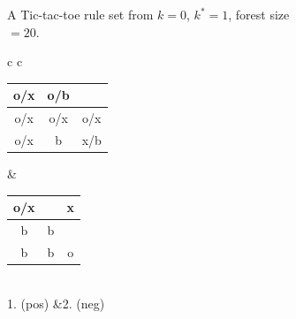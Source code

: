 \documentclass[10pt]{article}
\begin{document}
\begin{figure}[!ht]
\begin{subfigure}{\textwidth}
\begin{tabular}{c c}
\end{tabular}
\caption{A Tic-tac-toe rule set from $k=0$, $k^*=1$, forest size $=20$.}
\label{fig:ttt0-1-20}\end{subfigure}
\vspace{1em}

\begin{subfigure}{\textwidth}
\centering
\begin{tabular}{c c}
	\begin{small}
	\begin{tabular}{c|c|c}
	\hspace*{-0.4em}o/x\hspace*{-0.4em}&\hspace*{-0.4em}o/b\hspace*{-0.4em}&  \\ \hline
	\hspace*{-0.4em}o/x\hspace*{-0.4em}&\hspace*{-0.4em}o/x\hspace*{-0.4em}&\hspace*{-0.4em}o/x\hspace*{-0.4em}\\ \hline
	\hspace*{-0.4em}o/x\hspace*{-0.4em}&\hspace*{-0.4em}b\hspace*{-0.4em}&\hspace*{-0.4em}x/b\hspace*{-0.4em}  
	\end{tabular}
	\end{small}
	&
	\begin{small}
	\begin{tabular}{c|c|c}
	\hspace*{-0.4em}o/x\hspace*{-0.4em}&&\hspace*{-0.4em}x\hspace*{-0.4em}\\ \hline
	\hspace*{-0.4em}b\hspace*{-0.4em}&\hspace*{-0.4em}b\hspace*{-0.4em}&  \\ \hline
	\hspace*{-0.4em}b\hspace*{-0.4em}&\hspace*{-0.4em}b\hspace*{-0.4em}&\hspace*{-0.4em}o\hspace*{-0.4em}
	\end{tabular}
	\end{small}\\
	1. (pos) &2. (neg)


\end{tabular}
\end{subfigure}
\end{figure}
\end{document}
